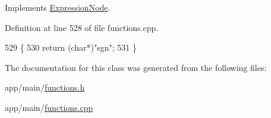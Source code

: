 Implements \hyperlink{classExpressionNode_a42a5e9562b0f645a19dcc83f698069b5}{Expression\+Node}.



Definition at line 528 of file functions.\+cpp.


\begin{DoxyCode}
529 \{
530     \textcolor{keywordflow}{return} (\textcolor{keywordtype}{char}*)\textcolor{stringliteral}{"sgn"};
531 \}
\end{DoxyCode}


The documentation for this class was generated from the following files\+:\begin{DoxyCompactItemize}
\item 
app/main/\hyperlink{functions_8h}{functions.\+h}\item 
app/main/\hyperlink{functions_8cpp}{functions.\+cpp}\end{DoxyCompactItemize}
